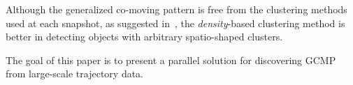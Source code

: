Although the generalized co-moving pattern is free from the clustering methods used at each snapshot, as suggested in~\cite{jeung2008convoy}, the \emph{density}-based clustering method is better in detecting objects with arbitrary spatio-shaped clusters.

The goal of this paper is to present a parallel solution for discovering GCMP from large-scale trajectory data.